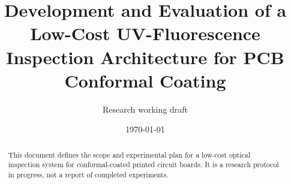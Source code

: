 \documentclass[12pt]{article}
\title{Development and Evaluation of a Low-Cost UV-Fluorescence Inspection Architecture for PCB Conformal Coating}
\author{Research working draft}
\date{\today}
\begin{document}
\maketitle
\begin{abstract}
This document defines the scope and experimental plan for a low-cost optical
inspection system for conformal-coated printed circuit boards. It is a research
protocol in progress, not a report of completed experiments.
\end{abstract}
\tableofcontents





\clearpage
{}
{}

\end{document}

